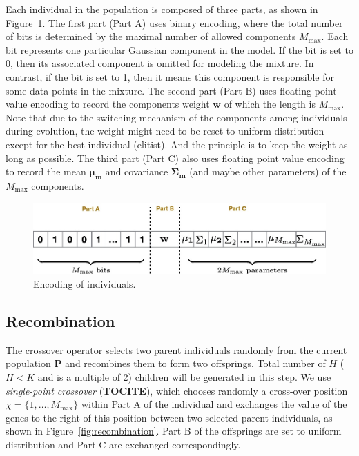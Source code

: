 \documentclass{article} %
\begin{document}
Each individual in the population is composed of three parts, as shown in Figure~\ref{fig:encoding}. The first part (Part A) uses binary encoding, where the total number of bits is determined by the maximal number of allowed components $M_{\max}$. Each bit represents one particular Gaussian component in the model. If the bit is set to 0, then its associated component is omitted for modeling the mixture. In contrast, if the bit is set to 1, then it means this component is responsible for some data points in the mixture. The second part (Part B) uses floating point value encoding to record the components weight $\mathbf{w}$ of which the length is $M_{\max}$. Note that due to the switching mechanism of the components among individuals during evolution, the weight might need to be reset to uniform distribution except for the best individual (elitist). And the principle is to keep the weight as long as possible. The third part (Part C) also uses floating point value encoding to record the mean $\boldsymbol{\mu_m}$ and covariance $\boldsymbol{\Sigma_m}$ (and maybe other parameters) of the $M_{\max}$ components. 


\begin{figure}[h]
\begin{center}
\includegraphics[scale=0.3]{encoding.jpg}
\end{center}
\caption{Encoding of individuals.}
\label{fig:encoding}
\end{figure}

 
\subsection{Recombination}

The crossover operator selects two parent individuals randomly from the current population $\mathbf{P}$ and recombines them to form two offsprings. Total number of $H$ ($H<K$ and is a multiple of 2) children will be generated in this step. We use \textit{single-point crossover} (\textbf{TOCITE}), which chooses randomly a cross-over position $\chi = \{1, \ldots, M_{\max}\}$ within Part A of the individual and exchanges the value of the genes to the right of this position between two selected parent individuals, as shown in Figure~\ref{fig:recombination}. Part B of the offsprings are set to uniform distribution and Part C are exchanged correspondingly.
\end{document}
